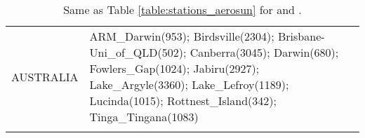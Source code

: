 \documentclass[journal abbreviation, manuscript]{copernicus}
\begin{document}
\begin{table}
\begin{tabularx}{\textwidth}{lX}
 AUSTRALIA &                                                                                                                                                                                                                                                                                                                                                                                                                                                                                                                                                                                                                                                                                                                                                                                                                                                                                                                                                                                                                                                                                                                                                                                                                                                                                                                                                                                                                                                                                                                                                                                                                                                                                                                                                                                                                                                                                                                                                                                                                                                                                                                                                                                ARM\_Darwin(953); Birdsville(2304); Brisbane-Uni\_of\_QLD(502); Canberra(3045); Darwin(680); Fowlers\_Gap(1024); Jabiru(2927); Lake\_Argyle(3360); Lake\_Lefroy(1189); Lucinda(1015); Rottnest\_Island(342); Tinga\_Tingana(1083) \\
\bottomhline
 \end{tabularx}
 \caption{Same as Table \ref{table:stations_aerosun} for  and .}
 \label{table:stations_aerosda}
\end{table}
\end{document}
